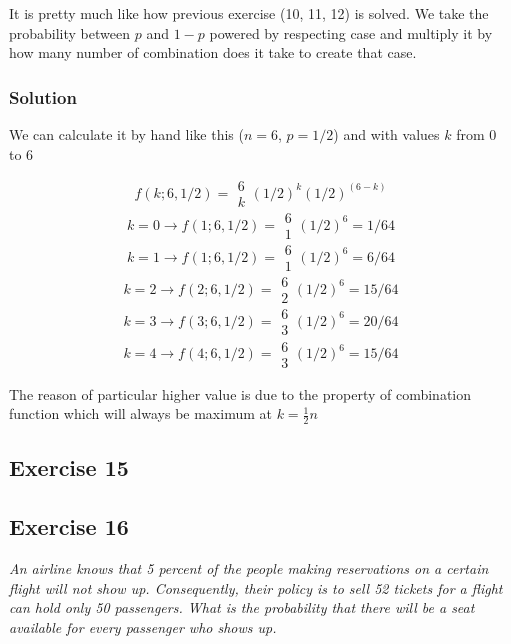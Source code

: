 \documentclass[12pt,a4paper]{article}
\begin{document}
It is pretty much like how previous exercise (10, 11, 12) is solved. We take the probability between $p$ and $1-p$ powered by respecting case and multiply it by how many number of combination does it take to create that case.

\subsubsection {Solution}

We can calculate it by hand like this ($n=6$, $p=1/2$) and with values $k$ from 0 to 6

\[
f(k; 6, 1/2) = \begin{array}{c}6\\k\end{array}(1/2)^k (1/2)^{(6-k)}
\]
\[ k=0 \to f(1;6,1/2) = \begin{array}{c}6\\1\end{array}(1/2)^6 = 1/64 \]
\[ k=1 \to f(1;6,1/2) = \begin{array}{c}6\\1\end{array}(1/2)^6 = 6/64 \]
\[ k=2 \to f(2;6,1/2) = \begin{array}{c}6\\2\end{array}(1/2)^6 = 15/64 \]
\[ k=3 \to f(3;6,1/2) = \begin{array}{c}6\\3\end{array}(1/2)^6 = 20/64 \]
\[ k=4 \to f(4;6,1/2) = \begin{array}{c}6\\3\end{array}(1/2)^6 = 15/64 \]

The reason of particular higher value is due to the property of combination function which will always be maximum at $k = \frac{1}{2}n$

\subsection{Exercise 15}


\subsection{Exercise 16}

\textit{An airline knows that 5 percent of the people making reservations on a certain flight will not show up. Consequently, their policy is to sell 52 tickets for a flight can hold only 50 passengers. What is the probability that there will be a seat available for every passenger who shows up.}
\end{document}
